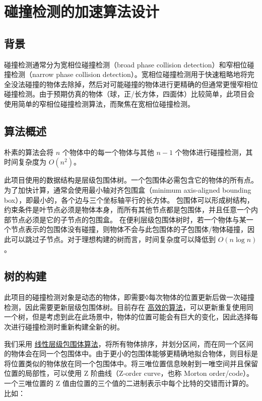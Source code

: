 \section{碰撞检测的加速算法设计}

\subsection{背景}

碰撞检测通常分为宽相位碰撞检测（broad phase collision detection）和窄相位碰撞检测（narrow phase collision detection）\cite{nvidiaCollisionDetection}。宽相位碰撞检测用于快速粗略地将完全没法碰撞的物体去除掉，然后对可能碰撞的物体进行更精确的但通常更慢窄相位碰撞检测。由于预期仿真的物体（球，正/长方体，四面体）比较简单，此项目会使用简单的窄相位碰撞检测算法，而聚焦在宽相位碰撞检测。

\subsection{算法概述}

朴素的算法会将 $n$ 个物体中的每一个物体与其他 $n-1$ 个物体进行碰撞检测，其时间复杂度为 $O(n^2)$。


此项目使用的数据结构是层级包围体树。一个包围体必需包含它的物体的所有点。为了加快计算，通常会使用最小轴对齐包围盒（minimum axis-aligned bounding box），即最小的，各个边与三个坐标轴平行的长方体。
包围体可以形成树结构，约束条件是叶节点必须是物体本身，而所有其他节点都是包围体，并且任意一个内部节点必须是它的子节点的包围盒。
在便利层级包围体树时，若一个物体与某一个节点表示的包围体没有碰撞，则物体不会与此包围体的子包围体/物体碰撞，因此可以跳过子节点。对于理想构建的树而言，时间复杂度可以降低到 $O(n\log n)$。

\subsection{树的构建}

此项目的碰撞检测对象是动态的物体，即需要◊每次物体的位置更新后做一次碰撞检测，因此需要更新层级包围体树。目前存在 \href{https://web.archive.org/web/20140113213158/http://visual-computing.intel-research.net/publications/papers/2008/async/AsyncBVHJournal2008.pdf}{高效的算法}，可以更新重复使用同一个树，但是考虑到此在此场景中，物体的位置可能会有巨大的变化，因此选择每次进行碰撞检测时重新构建全新的树。

我们采用 \href{https://luebke.us/publications/eg09.pdf}{线性层级包围体算法}，将所有物体排序，并划分区间，而在同一个区间的物体会在同一个包围体中。由于更小的包围体能够更精确地拟合物体，则目标是将位置类似的物体放在同一个包围体中。将三唯位置信息映射到一唯空间并且保留位置的局部性，可以使用 Z 阶曲线（Z-order curve，也称 Morton order/code）。一个三唯位置的 Z 值由位置的三个值的二进制表示中每个比特的交错而计算的。比如：

